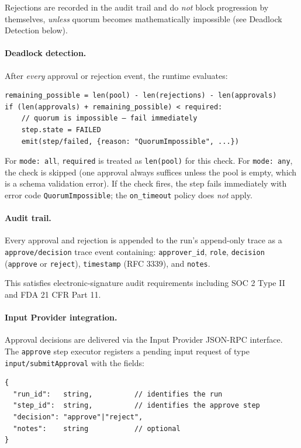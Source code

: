 Rejections are recorded in the audit trail and do \emph{not} block progression by
themselves, \emph{unless} quorum becomes mathematically impossible (see Deadlock
Detection below).

\paragraph{Deadlock detection.}
After \emph{every} approval or rejection event, the runtime evaluates:

\begin{verbatim}
remaining_possible = len(pool) - len(rejections) - len(approvals)
if (len(approvals) + remaining_possible) < required:
    // quorum is impossible — fail immediately
    step.state = FAILED
    emit(step/failed, {reason: "QuorumImpossible", ...})
\end{verbatim}

For \texttt{mode: all}, \texttt{required} is treated as \texttt{len(pool)} for this
check. For \texttt{mode: any}, the check is skipped (one approval always suffices unless
the pool is empty, which is a schema validation error). If the check fires, the step
fails immediately with error code \texttt{QuorumImpossible}; the \texttt{on\_timeout}
policy does \emph{not} apply.

\paragraph{Audit trail.}
Every approval and rejection is appended to the run's append-only trace as a
\texttt{approve/decision} trace event containing:
\texttt{approver\_id}, \texttt{role}, \texttt{decision} (\texttt{approve}
or \texttt{reject}), \texttt{timestamp} (RFC 3339), and \texttt{notes}.

This satisfies electronic-signature audit requirements including SOC 2 Type II and
FDA 21 CFR Part 11.

\paragraph{Input Provider integration.}
Approval decisions are delivered via the Input Provider JSON-RPC interface. The
\texttt{approve} step executor registers a pending input request of type
\texttt{input/submitApproval} with the fields:

\begin{verbatim}
{
  "run_id":   string,          // identifies the run
  "step_id":  string,          // identifies the approve step
  "decision": "approve"|"reject",
  "notes":    string           // optional
}
\end{verbatim}

